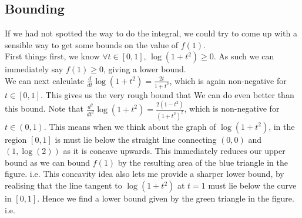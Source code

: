 \documentclass{article}
\begin{document}
\subsection{Bounding }
If we had not spotted the way to do the integral, we could try to come up with a sensible way to get some bounds on the value of $f(1)$. \\
First things first, we know $\forall t \in [0,1], \, \log(1+t^2) \geq 0$. As such we can immediately say $f(1) \geq 0$, giving a lower bound.\\
We can next calculate $\frac{d}{dt}\log(1+t^2) = \frac{2t}{1+t^2}$, which is again non-negative for $t \in [0,1]$. This gives us the very rough bound that 
We can do even better than this bound. Note that $\frac{d^2}{dt^2} \log(1+t^2) = \frac{2(1-t^2)}{(1+t^2)^2}$, which is non-negative for $t\in(0,1)$. This means when we think about the graph of $\log(1+t^2)$, in the region $[0,1]$ is must lie below the straight line connecting $(0,0)$ and $(1,\log(2))$ as it is concave upwards. This immediately reduces our upper bound as we can bound $f(1)$ by the resulting area of the blue triangle in the figure. i.e. 
This concavity idea also lets me provide a sharper lower bound, by realising that the line tangent to $\log(1+t^2)$ at $t=1$ must lie below the curve in $[0,1]$. Hence we find a lower bound given by the green triangle in the figure. i.e. 
\begin{center}
\end{center}
\end{document}
